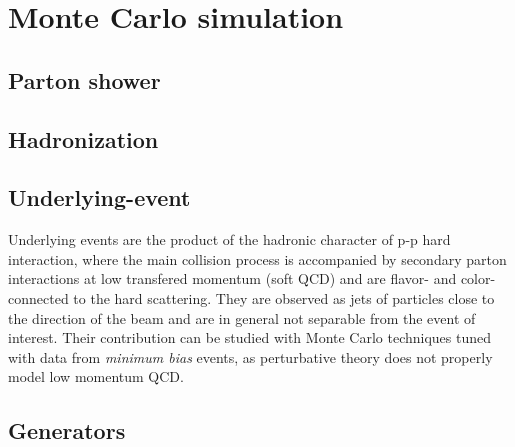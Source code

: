 \clearpage{\pagestyle{empty}\cleardoublepage}

\chapter{Monte Carlo simulation}\label{chap:mc}


\section{Parton shower}\label{sec:partonshower}

\section{Hadronization}\label{sec:hadronization}

\section{Underlying-event}\label{sec:underlyingevent}

Underlying events are the product of the hadronic character of p-p hard interaction, where the main collision process
is accompanied by secondary parton interactions at low transfered momentum (soft QCD) and are flavor- and color-connected to the
hard scattering. They are observed as jets of particles close to the direction of the beam and are in general not 
separable from the event of interest. Their contribution can be studied with Monte Carlo techniques tuned with data from 
\textit{minimum bias} events, as perturbative theory does not properly model low momentum QCD.


\section{Generators}\label{sec:generators}

